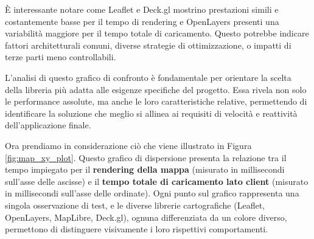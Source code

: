 È interessante notare come Leaflet e Deck.gl mostrino prestazioni simili e
costantemente basse per il tempo di rendering e OpenLayers presenti una
variabilità maggiore per il tempo totale di caricamento. Questo potrebbe indicare
fattori architetturali comuni, diverse strategie di ottimizzazione, o impatti di
terze parti meno controllabili.

L'analisi di questo grafico di confronto è fondamentale per orientare la scelta della
libreria più adatta alle esigenze specifiche del progetto. Essa rivela non solo
le performance assolute, ma anche le loro caratteristiche relative, permettendo
di identificare la soluzione che meglio si allinea ai requisiti di velocità e
reattività dell'applicazione finale.

Ora prendiamo in considerazione ciò che viene illustrato in Figura
\ref{fig:map_xy_plot}. Questo grafico di dispersione presenta la relazione tra il
tempo impiegato per il \textbf{rendering della mappa} (misurato in millisecondi sull'asse
delle ascisse) e il \textbf{tempo totale di caricamento lato client} (misurato
in millisecondi sull'asse delle ordinate). Ogni punto sul grafico rappresenta
una singola osservazione di test, e le diverse librerie cartografiche (Leaflet, OpenLayers,
MapLibre, Deck.gl), ognuna differenziata da un colore diverso, permettono di
distinguere visivamente i loro rispettivi comportamenti.

